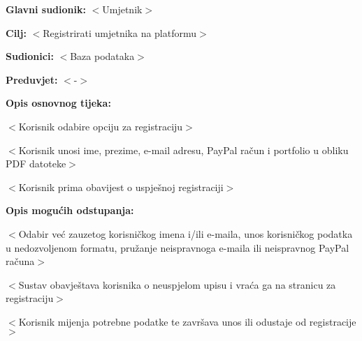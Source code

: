 							\noindent {}
							\begin{packed_item}
								
								\item \textbf{Glavni sudionik: }$<$Umjetnik$>$
								\item  \textbf{Cilj:} $<$Registrirati umjetnika na platformu$>$
								\item  \textbf{Sudionici:} $<$Baza podataka$>$
								\item  \textbf{Preduvjet:} $<$-$>$
								\item  \textbf{Opis osnovnog tijeka:}
								
								\item[] \begin{packed_enum}
									
									\item $<$Korisnik odabire opciju za registraciju$>$
									\item $<$Korisnik unosi ime, prezime, e-mail adresu, PayPal račun i 
									portfolio u obliku PDF datoteke$>$
									\item $<$Korisnik prima obavijest o uspješnoj registraciji$>$
								\end{packed_enum}
								
								\item  \textbf{Opis mogućih odstupanja:}
								
								\item[] \begin{packed_item}
									
									\item[2.a] $<$Odabir već zauzetog korisničkog imena i/ili e-maila, unos korisničkog 
									podatka u nedozvoljenom formatu, pružanje neispravnoga e-maila ili neispravnog PayPal računa$>$
									\item[] \begin{packed_enum}
										
										\item $<$Sustav obavještava korisnika o neuspjelom upisu i 
										vraća ga na stranicu za registraciju$>$
										\item $<$Korisnik mijenja potrebne podatke te završava unos ili 
										odustaje od registracije$>$
										
									\end{packed_enum}
									
								\end{packed_item}
							\end{packed_item}
						
